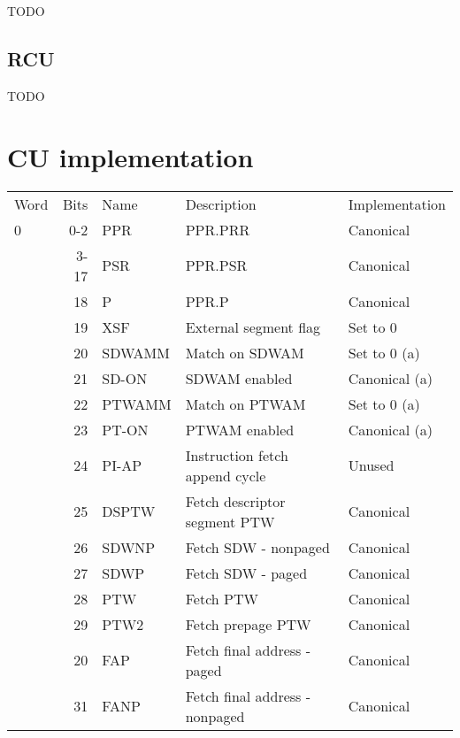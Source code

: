 \documentclass[notitlepage]{report}
\begin{document}
TODO

\subsection{RCU}

TODO

\section{CU implementation}

\begin{tabular}{lrlll}

Word & Bits  & Name      & Description & Implementation \\
0    & 0-2   & PPR       & PPR.PRR                             & Canonical \\
     & 3-17  & PSR       & PPR.PSR                             & Canonical \\
     & 18    & P         & PPR.P                               & Canonical \\
     & 19    & XSF       & External segment flag               & Set to 0 \\
     & 20    & SDWAMM    & Match on SDWAM                      & Set to 0 (a) \\
     & 21    & SD-ON     & SDWAM enabled                       & Canonical (a) \\
     & 22    & PTWAMM    & Match on PTWAM                      & Set to 0 (a) \\
     & 23    & PT-ON     & PTWAM enabled                       & Canonical (a) \\
     & 24    & PI-AP     & Instruction fetch append cycle      & Unused \\
     & 25    & DSPTW     & Fetch descriptor segment PTW        & Canonical \\
     & 26    & SDWNP     & Fetch SDW - nonpaged                & Canonical \\
     & 27    & SDWP      & Fetch SDW - paged                   & Canonical \\
     & 28    & PTW       & Fetch PTW                           & Canonical \\
     & 29    & PTW2      & Fetch prepage PTW                   & Canonical \\
     & 20    & FAP       & Fetch final address - paged         & Canonical \\
     & 31    & FANP      & Fetch final address - nonpaged      & Canonical \\

\end{tabular}
\end{document}

